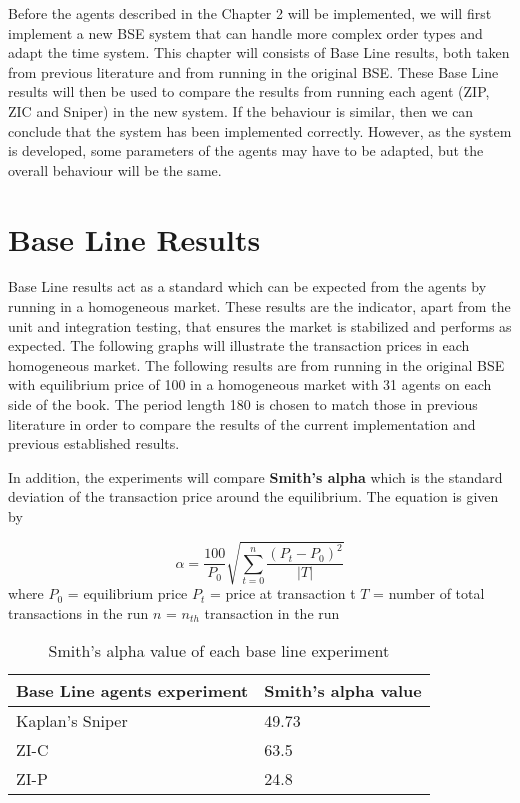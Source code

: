 Before the agents described in the Chapter 2 will be implemented, we will first implement a new BSE system that can handle more complex order types and adapt the time system. This chapter will consists of Base Line results, both taken from previous literature and from running in the original BSE. These Base Line results will then be used to compare the results from running each agent (ZIP, ZIC and Sniper) in the new system. If the behaviour is similar, then we can conclude that the system has been implemented correctly. However, as the system is developed, some parameters of the agents may have to be adapted, but the overall behaviour will be the same. 

\section{Base Line Results} 
Base Line results act as a standard which can be expected from the agents by running in a homogeneous market. These results are the indicator, apart from the unit and integration testing, that ensures the market is stabilized and performs as expected. The following graphs will illustrate the transaction prices in each homogeneous market. The following results are from running in the original BSE with equilibrium price of 100 in a homogeneous market with 31 agents on each side of the book. The period length 180 is chosen to match those in previous literature in order to compare the results of the current implementation and previous established results. 

In addition, the experiments will compare \textbf{Smith's alpha} which is the standard deviation of the transaction price around the equilibrium. The equation is given by 

\begin{equation}
\alpha = \frac{100}{P_0}\sqrt{\sum_{t=0}^{n} \frac{(P_t - P_0)^2}{|T|} }
\end{equation}
where $P_0$ = equilibrium price 
\newline $P_t$ = price at transaction t 
\newline $T$ = number of total transactions in the run
\newline $n$ = $n_{th}$ transaction in the run

\begin{table}[h]
\centering
\begin{tabular}{ |m||p{4cm}|} 
\hline
\textbf{Base Line agents experiment}& \textbf{Smith's alpha value} \\
\hline
\hline
Kaplan's Sniper & 49.73 \\ 
\hline
ZI-C & 63.5\\ 
\hline
ZI-P & 24.8 \\ 
\hline
\end{tabular}
\caption{Smith's alpha value of each base line experiment}  
\end{table}
\FloatBarrier

